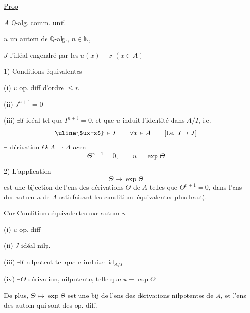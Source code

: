 \uline{Prop}

$A$ $\mathbb{Q}$-alg. comm. unif.

$u$ un autom de $\mathbb{Q}$-alg., $n\in\mathbb{N}$,

$J$ l'idéal engendré par les $u(x)-x$ $(x\in A)$

1) Conditions équivalentes

(i) $u$ op. diff d'ordre $\leq n$

(ii) $J^{n+1}=0$

(iii) $\exists I$ idéal  tel que $I^{n+1}=0$, et que $u$ induit l'identité dans $A/I$, i.e.
\[
\uline{$ux-x$}\in I\qquad\forall x\in A\qquad[\text{i.e. }I\supset J]
\]
 
$\exists$ dérivation $\Theta:A\longrightarrow A$ avec
\[
\Theta^{n+1}=0,\qquad u=\exp\Theta
\]


2) L'application
\[
\Theta\longmapsto\exp\Theta
\]
est une bijection de l'ens des dérivations $\Theta$ de $A$ telles que $\Theta^{n+1}=0$, dans l'ens des autom $u$ de $A$  satisfaisant les conditions équivalentes plus haut).

\uline{Cor} Conditions équivalentes sur autom $u$

(i) $u$ op. diff

(ii) $J$ idéal nilp.

(iii) $\exists I$ nilpotent tel que $u$ induise $\operatorname{id}_{A/I}$

(iv) $\exists\Theta$ dérivation, nilpotente, telle que $u=\exp\Theta$

De plus, $\Theta\longmapsto\exp\Theta$ est une bij de l'ens des dérivations nilpotentes de $A$, et l'ens des autom  qui sont des op. diff.
